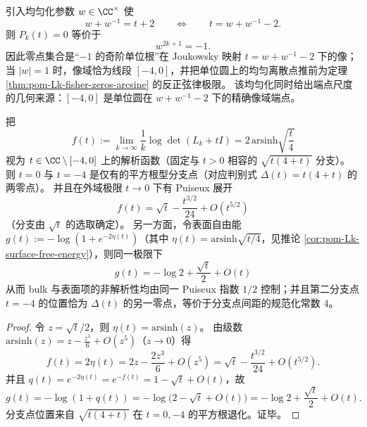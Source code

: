 \begin{remark}\label{rem:pom-Lk-fisher-zeros-uniformization}
引入均匀化参数 \(w\in\CC^\times\) 使
\[
w+w^{-1}=t+2
\qquad\Longleftrightarrow\qquad
t=w+w^{-1}-2.
\]
则 \(P_k(t)=0\) 等价于
\[
w^{2k+1}=-1.
\]
因此零点集合是“\(-1\) 的奇阶单位根”在 Joukowsky 映射 \(t=w+w^{-1}-2\) 下的像；
当 \(|w|=1\) 时，像域恰为线段 \([-4,0]\)，并把单位圆上的均匀离散点推前为定理 \ref{thm:pom-Lk-fisher-zeros-arcsine} 的反正弦律极限。
该均匀化同时给出端点尺度的几何来源：\([-4,0]\) 是单位圆在 \(w+w^{-1}-2\) 下的精确像域端点。
\end{remark}

\begin{proposition}[临界端点的平方根型分支：\texorpdfstring{$t=0$}{t=0} 与 \texorpdfstring{$t=-4$}{t=-4} 的 Puiseux 指数刚性]\label{prop:pom-Lk-branch-puiseux}
把
\[
f(t):=\lim_{k\to\infty}\frac{1}{k}\log\det(L_k+tI)
=2\,\mathrm{arsinh}\sqrt{\frac{t}{4}}
\]
视为 \(t\in\CC\setminus[-4,0]\) 上的解析函数（固定与 \(t>0\) 相容的 \(\sqrt{t(4+t)}\) 分支）。
则 \(t=0\) 与 \(t=-4\) 是仅有的平方根型分支点（对应判别式 \(\Delta(t)=t(4+t)\) 的两零点）。
并且在外域极限 \(t\to 0\) 下有 Puiseux 展开
\[
\boxed{\;
f(t)=\sqrt{t}-\frac{t^{3/2}}{24}+O(t^{5/2})\;}
\]
（分支由 \(\sqrt{t}\) 的选取确定）。
另一方面，令表面自由能 \(g(t):=-\log(1+e^{-2\eta(t)})\)（其中 \(\eta(t)=\mathrm{arsinh}\sqrt{t/4}\)，见推论 \ref{cor:pom-Lk-surface-free-energy}），则同一极限下
\[
\boxed{\;
g(t)=-\log 2+\frac{\sqrt{t}}{2}+O(t)\;}
\]
从而 bulk 与表面项的非解析性均由同一 Puiseux 指数 \(1/2\) 控制；并且第二分支点 \(t=-4\) 的位置恰为 \(\Delta(t)\) 的另一零点，等价于分支点间距的规范化常数 \(4\)。
\end{proposition}

\begin{proof}
令 \(z=\sqrt{t}/2\)，则 \(\eta(t)=\mathrm{arsinh}(z)\)。
由级数 \(\mathrm{arsinh}(z)=z-\frac{z^3}{6}+O(z^5)\)（\(z\to 0\)）得
\[
f(t)=2\eta(t)=2z-\frac{2z^3}{6}+O(z^5)
=\sqrt{t}-\frac{t^{3/2}}{24}+O(t^{5/2}).
\]
并且 \(q(t)=e^{-2\eta(t)}=e^{-f(t)}=1-\sqrt{t}+O(t)\)，故
\[
g(t)=-\log(1+q(t))
=-\log\!\bigl(2-\sqrt{t}+O(t)\bigr)
=-\log2+\frac{\sqrt{t}}{2}+O(t).
\]
分支点位置来自 \(\sqrt{t(4+t)}\) 在 \(t=0,-4\) 的平方根退化。证毕。
\end{proof}

